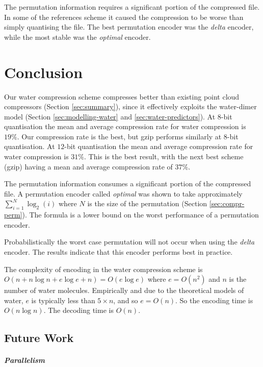 \documentclass[a4paper]{report}
\begin{document}
The permutation information requires a significant portion of the compressed
file. In some of the references scheme it caused the compression to be worse
than simply quantising the file. The best permutation encoder was the
\emph{delta} encoder, while the most stable was the \emph{optimal} encoder.



\chapter{Conclusion}

Our water compression scheme compresses better than existing point cloud
compressors (Section \ref{sec:summary}), since it effectively exploits the
water-dimer model (Section \ref{sec:modelling-water} and
\ref{sec:water-predictors}). At $8$-bit quantisation the mean and average
compression rate for water compression is $19\%$. Our compression rate is the
best, but gzip performs similarly at $8$-bit quantisation. At $12$-bit
quantisation the mean and average compression rate for water compression is
$31\%$. This is the best result, with the next best scheme (gzip) having a
mean and average compression rate of $37\%$.

The permutation information consumes a significant portion of the compressed
file. A permutation encoder called \emph{optimal} was shown to take
approximately $\sum^{N}_{i=1} \log_2(i)$ where $N$ is the size of the
permutation (Section \ref{sec:compr-perm}). The formula is a lower bound on
the worst performance of a permutation encoder.

Probabilistically the worst case permutation will not occur when using the
\emph{delta} encoder. The results indicate that this encoder performs best in
practice.

The complexity of encoding in the water compression scheme is $O(n + n \log n
+ e \log e + n) = O(e \log e)$ where $e = O(n^2)$ and $n$ is the number of
water molecules. Empirically and due to the theoretical models of water, $e$
is typically less than $5 \times n$, and so $e = O(n)$. So the encoding time
is $O(n \log n)$. The decoding time is $O(n)$.


\section{Future Work}

\paragraph{Parallelism}
\end{document}
